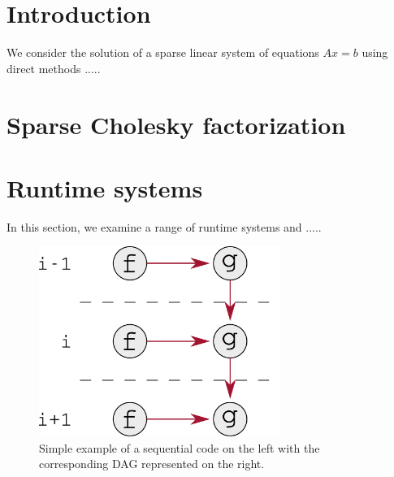 \documentclass{article}
\begin{document}
\newpage
\setcounter{page}{1}

\section{Introduction} \label{sec:introduction}

We consider the solution of a sparse linear system of equations $Ax = b$ 
using direct methods .....


\section{Sparse Cholesky factorization}\label{sec:chol}
\setcounter{equation}{0}
\setcounter{table}{0}
\setcounter{figure}{0}

\section{Runtime systems}\label{sec:runtime}
\setcounter{equation}{0}
\setcounter{table}{0}
\setcounter{figure}{0}
In this section, we examine a range of runtime systems and .....

\begin{figure}[!h]
  \begin{minipage}{0.5\linewidth}
    \centering {}
    
  \end{minipage}
  \begin{minipage}{0.5\linewidth}
    \centering
    \includegraphics[width=0.7\textwidth]{figures/example_dag}
  \end{minipage}
  \caption{\label{fig:seq-example} Simple example of a sequential code
    on the left with the corresponding DAG represented on the right.}
\end{figure}
\end{document}
